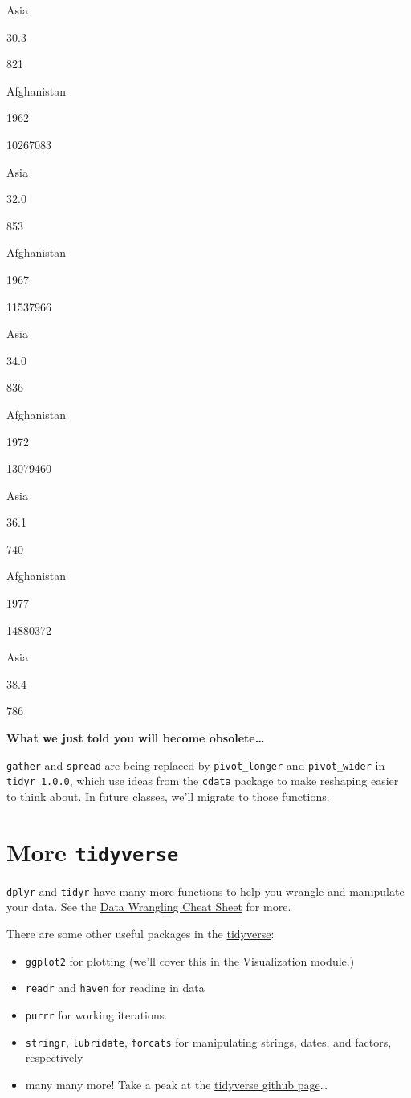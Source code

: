 \documentclass[]{book}
\providecommand{\tightlist}{%
  \setlength{\itemsep}{0pt}\setlength{\parskip}{0pt}}
\begin{document}
Asia

30.3

821

Afghanistan

1962

10267083

Asia

32.0

853

Afghanistan

1967

11537966

Asia

34.0

836

Afghanistan

1972

13079460

Asia

36.1

740

Afghanistan

1977

14880372

Asia

38.4

786

\textbf{What we just told you will become obsolete\ldots{}}

\texttt{gather} and \texttt{spread} are being replaced by \texttt{pivot\_longer} and \texttt{pivot\_wider} in \texttt{tidyr\ 1.0.0}, which use ideas from the \texttt{cdata} package to make reshaping easier to think about. In future classes, we'll migrate to those functions.

\hypertarget{more-tidyverse}{%
\section{\texorpdfstring{More \texttt{tidyverse}}{More tidyverse}}\label{more-tidyverse}}

\texttt{dplyr} and \texttt{tidyr} have many more functions to help you wrangle and manipulate
your data. See the \href{https://www.rstudio.com/wp-content/uploads/2015/02/data-wrangling-cheatsheet.pdf}{Data Wrangling Cheat Sheet} for more.

There are some other useful packages in the \href{http://www.tidyverse.org}{tidyverse}:

\begin{itemize}
\tightlist
\item
  \texttt{ggplot2} for plotting (we'll cover this in the Visualization module.)
\item
  \texttt{readr} and \texttt{haven} for reading in data
\item
  \texttt{purrr} for working iterations.
\item
  \texttt{stringr}, \texttt{lubridate}, \texttt{forcats} for manipulating strings, dates, and factors, respectively
\item
  many many more! Take a peak at the \href{https://github.com/tidyverse}{tidyverse github page}\ldots{}
\end{itemize}
\end{document}
